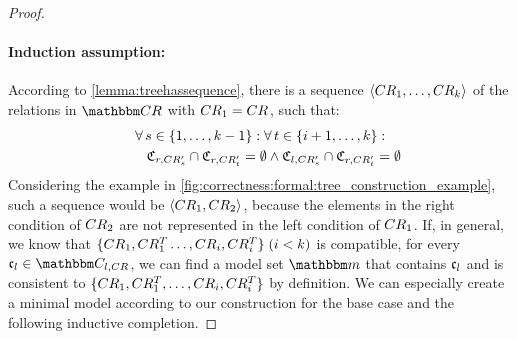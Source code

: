 \begin{proof}
    \paragraph{Induction assumption:} 
    According to \autoref{lemma:treehassequence}, there is a sequence $\langle CR_{1}, \dots, CR_{k} \rangle$ of the relations in $\consistencyrelationset{CR}$ with $CR_{1} = CR_{}$, such that:
    \begin{align*}
        \formulaskip &
        \forall s \in \setted{1, \dots, k-1} : \forall t \in \setted{i+1, \dots, k} : \\
        & \formulaskip
        \classtuple{C}{r,\consistencyrelation{CR'}{s}} \cap \classtuple{C}{r,\consistencyrelation{CR'}{t}} = \emptyset 
        \land
        \classtuple{C}{l,\consistencyrelation{CR'}{s}} \cap 
        \classtuple{C}{r,\consistencyrelation{CR'}{t}} = \emptyset
    \end{align*}
    Considering the example in \autoref{fig:correctness:formal:tree_construction_example}, such a sequence would be $\langle CR_{1}, CR_{2} \rangle$, because the elements in the right condition of $CR_{2}$ are not represented in the left condition of $CR_{1}$.
    If, in general, we know that $\{ CR_{1}, CR^T_{1} \dots, CR_{i}, CR^T_{i} \}\; (i < k)$ is compatible, for every $\conditionelement{c}{l} \in \condition{C}{l,\consistencyrelation{CR}{}}$, we can find a model set $\modelset{m}$ that contains $\mathfrak{c}_{l}$ and is consistent to $\{ CR_{1}, CR^T_{1}, \dots, CR_{i}, CR^T_{i} \}$ by definition.
    We can especially create a minimal model according to our construction for the base case and the following inductive completion.
    

\end{proof}
